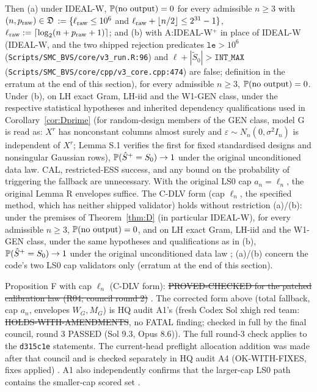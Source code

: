 \begin{proposition}
Then (a) under IDEAL-W, $\mathbb P(\text{no output})=0$ for every admissible $n\ge3$ with $(n,p_{\rm raw})\in\mathfrak D$ $:=\{\ell_{\rm raw}\le10^6$ and $\ell_{\rm raw}+\lfloor n/2\rfloor\le2^{31}-1\}$, $\ell_{\rm raw}:=\lceil\log_2(n+p_{\rm raw}+1)\rceil$; and (b) with A:IDEAL-W$^{+}$ in place of IDEAL-W (IDEAL-W, and the two shipped rejection predicates $\texttt{le}>10^6$ (\texttt{Scripts/SMC\_BVS/core/v3\_run.R:96}) and $\ell+|\tilde S_0|>\texttt{INT\_MAX}$ (\texttt{Scripts/SMC\_BVS/core/cpp/v3\_core.cpp:474}) are false; definition in the erratum at the end of this section), for every admissible $n\ge3$, $\mathbb P(\text{no output})=0$. Under (b), on LH exact Gram, LH-iid and the W1-GEN class, under the respective statistical hypotheses and inherited dependency qualifications used in Corollary~\ref{cor:Dprime} (for random-design members of the GEN class, model G is read as: $X^r$ has nonconstant columns almost surely and $\varepsilon\sim N_n(0,\sigma^2I_n)$ is independent of $X^r$; Lemma S.1 verifies the first for fixed standardised designs and nonsingular Gaussian rows), $\mathbb P(\hat S^{+}=S_0)\to1$ under the original unconditioned data law. CAL, restricted-ESS success, and any bound on the probability of triggering the fallback are unnecessary. With the original LS0 cap $a_n=\ell_n$, the original Lemma R envelopes suffice. The C-DLV form (cap $\ell_n$, the specified method, which has neither shipped validator) holds without restriction (a)/(b): under the premises of Theorem~\ref{thm:D} (in particular IDEAL-W), for every admissible $n\ge3$, $\mathbb P(\text{no output})=0$, and on LH exact Gram, LH-iid and the W1-GEN class, under the same hypotheses and qualifications as in (b), $\mathbb P(\hat S^{+}=S_0)\to1$ under the original unconditioned data law ; (a)/(b) concern the code's two LS0 cap validators only (erratum at the end of this section).
\end{proposition}
\begin{statusbox}
Proposition F with cap $\ell_n$ (C-DLV form): \st{PROVED-CHECKED for the patched calibration law (R04; council round 2)} . The corrected form above (total fallback, cap $a_n$, envelopes $W_G,M_G$) is HQ audit A1's (fresh Codex Sol xhigh red team: \st{HOLDS-WITH-AMENDMENTS}, no FATAL finding; checked in full by the final council, round 3 PASSED (Sol 9.3, Opus 8.6)). The full round-3 check applies to the \texttt{d315c1e} statements. The current-head preflight allocation addition was made after that council and is checked separately in HQ audit A4 (OK-WITH-FIXES, fixes applied) . A1 also independently confirms that the larger-cap LS0 path contains the smaller-cap scored set .
\end{statusbox}

